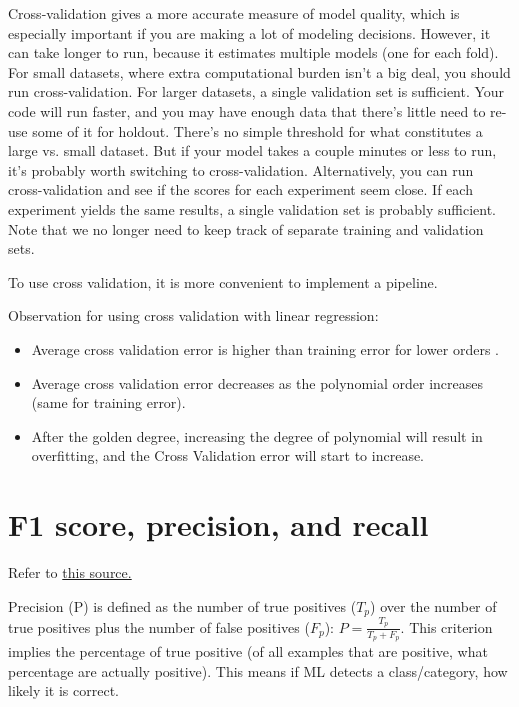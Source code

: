 \documentclass[12pt]{report}
\begin{document}
Cross-validation gives a more accurate measure of model quality, which is especially important if you are making a lot of modeling decisions. However, it can take longer to run, because it estimates multiple models (one for each fold). For small datasets, where extra computational burden isn't a big deal, you should run cross-validation. For larger datasets, a single validation set is sufficient. Your code will run faster, and you may have enough data that there's little need to re-use some of it for holdout. There's no simple threshold for what constitutes a large vs. small dataset. But if your model takes a couple minutes or less to run, it's probably worth switching to cross-validation. Alternatively, you can run cross-validation and see if the scores for each experiment seem close. If each experiment yields the same results, a single validation set is probably sufficient. Note that we no longer need to keep track of separate training and validation sets.

To use cross validation, it is more convenient to implement a pipeline.

Observation for using cross validation with linear regression:
\begin{itemize}
  \item Average cross validation error is higher than training error for lower orders .
  \item Average cross validation error decreases as the polynomial order increases (same for training error).
  \item After the golden degree, increasing the degree of polynomial will result in overfitting, and the Cross Validation error will start to increase.
\end{itemize}

\section{F1 score, precision, and recall}
Refer to \href{https://scikit-learn.org/stable/auto_examples/model_selection/plot_precision_recall.html#precision-recall}{this source.}

Precision (P) is defined as the number of true positives ($T_p$) over the number of true positives plus the number of false positives ($F_p$): $P = \frac{T_p}{T_p + F_p} $. This criterion implies the percentage of true positive (of all examples that are positive, what percentage are actually positive). This means if ML detects a class/category, how likely it is correct.
\end{document}
